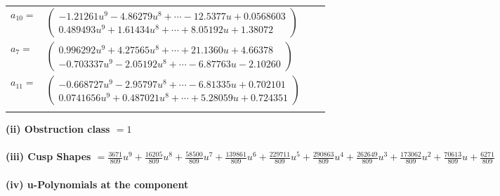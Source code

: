 \documentclass[1p]{elsarticle_modified}
\theoremstyle{definition}
\begin{document}
\begin{tabular}{m{7pt} m{180pt} m{7pt} m{180pt} }
\flushright $a_{10}=$&$\begin{pmatrix}-1.21261 u^{9}-4.86279 u^{8}+\cdots-12.5377 u+0.0568603\\0.489493 u^{9}+1.61434 u^{8}+\cdots+8.05192 u+1.38072\end{pmatrix}$ \\
\flushright $a_{7}=$&$\begin{pmatrix}0.996292 u^{9}+4.27565 u^{8}+\cdots+21.1360 u+4.66378\\-0.703337 u^{9}-2.05192 u^{8}+\cdots-6.87763 u-2.10260\end{pmatrix}$ \\
\flushright $a_{11}=$&$\begin{pmatrix}-0.668727 u^{9}-2.95797 u^{8}+\cdots-6.81335 u+0.702101\\0.0741656 u^{9}+0.487021 u^{8}+\cdots+5.28059 u+0.724351\end{pmatrix}$\\&\end{tabular}
\flushleft \textbf{(ii) Obstruction class $= 1$}\\~\\
\flushleft \textbf{(iii) Cusp Shapes $= \frac{3671}{809} u^9+\frac{16205}{809} u^8+\frac{58500}{809} u^7+\frac{139861}{809} u^6+\frac{229711}{809} u^5+\frac{290863}{809} u^4+\frac{262649}{809} u^3+\frac{173062}{809} u^2+\frac{70613}{809} u+\frac{6271}{809}$}\\~\\
\newpage\renewcommand{\arraystretch}{1}
\flushleft \textbf{(iv) u-Polynomials at the component}\newline \\
\end{document}
